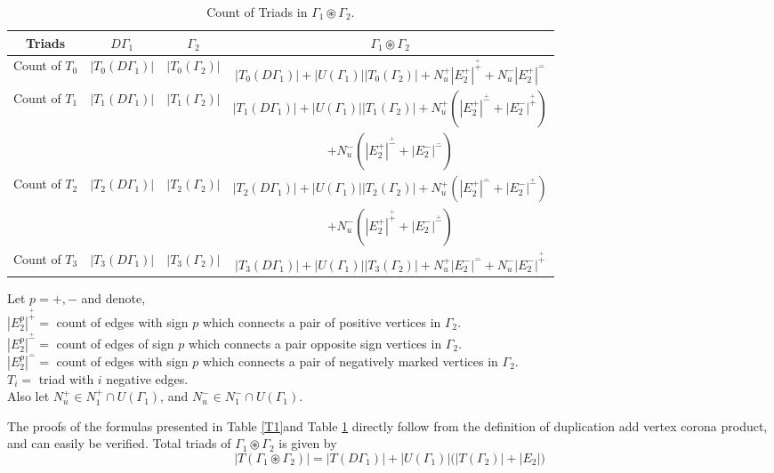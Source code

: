 \documentclass[12pt,a4paper]{article}
\theoremstyle{definition}
\theoremstyle{remark}
\begin{document}
     \begin{table}[ht]
        \centering
        \begin{tabular}{|c|c|c|c|} \hline 
            Triads &$D\Gamma_1$ &$\Gamma_2$ &$\Gamma_1\circledast\Gamma_2$\\ \hline\hline
            Count of $T_0$ &$|T_0(D\Gamma_1)|$ &$|T_0(\Gamma_2)|$ &$|T_0(D\Gamma_1)|+|U(\Gamma_1)||T_0(\Gamma_2)|+N_u^+|E_2^+|^{\overset{+}{+}}+N_u^-|E_2^+|^{\overset{-}{-}}$  \\ \hline
            Count of $T_1$ &$|T_1(D\Gamma_1)|$ &$|T_1(\Gamma_2)|$ &$|T_1(D\Gamma_1)|+|U(\Gamma_1)||T_1(\Gamma_2)|+N_u^+(|E_2^+|^{\overset{+}{-}}+|E_2^-|^{\overset{+}{+}})$\\ &&& $+N_u^-(|E_2^+|^{\overset{+}{-}}+|E_2^-|^{\overset{-}{-}})$\\ \hline
            Count of $T_2$ &$|T_2(D\Gamma_1)|$ &$|T_2(\Gamma_2)|$ &$|T_2(D\Gamma_1)|+|U(\Gamma_1)||T_2(\Gamma_2)|+N_u^+(|E_2^+|^{\overset{-}{-}}+|E_2^-|^{\overset{+}{-}})$\\&&&$+N_u^-(|E_2^+|^{\overset{+}{+}}+|E_2^-|^{\overset{+}{-}})$\\ \hline
            Count of $T_3$ &$|T_3(D\Gamma_1)|$ &$|T_3(\Gamma_2)|$  & $|T_3(D\Gamma_1)|+|U(\Gamma_1)||T_3(\Gamma_2)|+N_u^+|E_2^-|^{\overset{-}{-}}+N_u^-|E_2^-|^{\overset{+}{+}}$\\ \hline
            \end{tabular}
        \caption{Count of Triads in $\Gamma_1\circledast\Gamma_2.$}
        \label{T2}
    \end{table}
    
    Let $p=+,-$ and denote,\\
    $|E^p_2|^{\overset{+}{+}}=$ count of edges with sign $p$ which connects a pair of positive vertices in $\Gamma_2$.\\
    $|E^p_2|^{\overset{+}{-}}=$ count of edges of sign $p$ which connects a pair opposite sign vertices in $\Gamma_2$.\\
    $|E^p_2|^{\overset{-}{-}}=$ count of edges with sign $p$ which connects a pair of negatively marked vertices in $\Gamma_2$.\\
    $T_i=$ triad with $i$ negative edges.\\
    Also let  $N_u^+\in N_1^+\cap U(\Gamma_1)$, and $N_u^-\in N_1^-\cap U(\Gamma_1)$.

    The proofs of the formulas presented in Table \ref{T1}and Table \ref{T2} directly follow from the definition of duplication add vertex corona product, and can easily be verified. Total triads of $\Gamma_1\circledast\Gamma_2$ is given by \[|T(\Gamma_1\circledast\Gamma_2)|=|T(D\Gamma_1)|+|U(\Gamma_1)|\big(|T(\Gamma_2)|+|E_2|\big)\]
    
\end{document}
